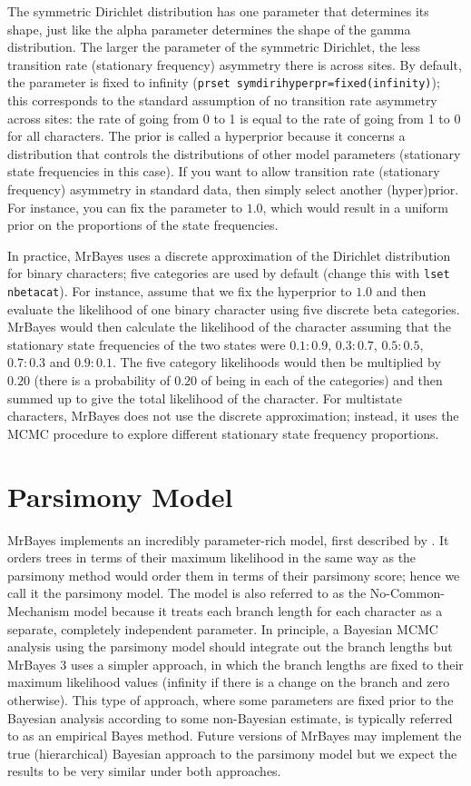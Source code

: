 \documentclass[12pt]{book}
\begin{document}
The symmetric Dirichlet distribution has one parameter that determines its shape, just like the
alpha parameter determines the shape of the gamma distribution. The larger the parameter of the
symmetric Dirichlet, the less transition rate (stationary frequency) asymmetry there is across
sites. By default, the parameter is fixed to infinity (\texttt{prset
symdirihyperpr=fixed(infinity)}); this corresponds to the standard assumption of no transition rate
asymmetry across sites: the rate of going from 0 to 1 is equal to the rate of going from 1 to 0 for
all characters. The prior is called a hyperprior because it concerns a distribution that controls
the distributions of other model parameters (stationary state frequencies in this case). If you
want to allow transition rate (stationary frequency) asymmetry in standard data, then simply select
another (hyper)prior. For instance, you can fix the parameter to $1.0$, which would result in a
uniform prior on the proportions of the state frequencies.

In practice, MrBayes uses a discrete approximation of the Dirichlet distribution for binary
characters; five categories are used by default (change this with \texttt{lset nbetacat}). For
instance, assume that we fix the hyperprior to $1.0$ and then evaluate the likelihood of one binary
character using five discrete beta categories. MrBayes would then calculate the likelihood of the
character assuming that the stationary state frequencies of the two states were $0.1:0.9$,
$0.3:0.7$, $0.5:0.5$, $0.7:0.3$ and $0.9:0.1$. The five category likelihoods would then be
multiplied by $0.20$ (there is a probability of $0.20$ of being in each of the categories) and then
summed up to give the total likelihood of the character. For multistate characters, MrBayes does
not use the discrete approximation; instead, it uses the MCMC procedure to explore different
stationary state frequency proportions.

\section{Parsimony Model}

MrBayes implements an incredibly parameter-rich model, first described by \citet{tuffley97}. It
orders trees in terms of their maximum likelihood in the same way as the parsimony method would
order them in terms of their parsimony score; hence we call it the parsimony model. The model is
also referred to as the No-Common-Mechanism model because it treats each branch length for each
character as a separate, completely independent parameter. In principle, a Bayesian MCMC analysis
using the parsimony model should integrate out the branch lengths but MrBayes 3 uses a simpler
approach, in which the branch lengths are fixed to their maximum likelihood values (infinity if
there is a change on the branch and zero otherwise). This type of approach, where some parameters
are fixed prior to the Bayesian analysis according to some non-Bayesian estimate, is typically
referred to as an empirical Bayes method. Future versions of MrBayes may implement the true
(hierarchical) Bayesian approach to the parsimony model but we expect the results to be very
similar under both approaches.
\end{document}
